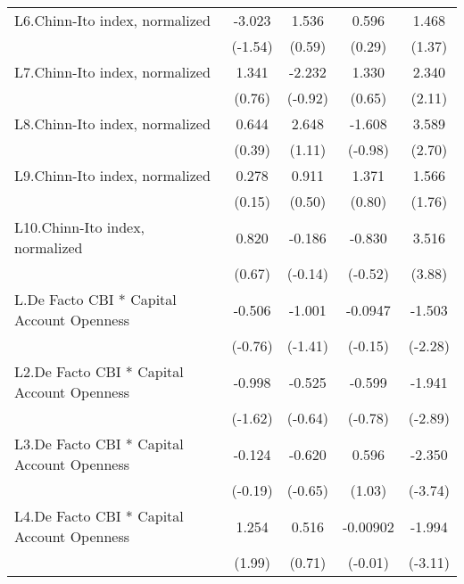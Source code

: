 {\begin{longtable}{l*{4}{c}}
\addlinespace
L6.Chinn-Ito index, normalized&   -3.023         &    1.536         &    0.596         &    1.468         \\
                &  (-1.54)         &   (0.59)         &   (0.29)         &   (1.37)         \\
\addlinespace
L7.Chinn-Ito index, normalized&    1.341         &   -2.232         &    1.330         &    2.340\sym{*}  \\
                &   (0.76)         &  (-0.92)         &   (0.65)         &   (2.11)         \\
\addlinespace
L8.Chinn-Ito index, normalized&    0.644         &    2.648         &   -1.608         &    3.589\sym{**} \\
                &   (0.39)         &   (1.11)         &  (-0.98)         &   (2.70)         \\
\addlinespace
L9.Chinn-Ito index, normalized&    0.278         &    0.911         &    1.371         &    1.566         \\
                &   (0.15)         &   (0.50)         &   (0.80)         &   (1.76)         \\
\addlinespace
L10.Chinn-Ito index, normalized&    0.820         &   -0.186         &   -0.830         &    3.516\sym{***}\\
                &   (0.67)         &  (-0.14)         &  (-0.52)         &   (3.88)         \\
\addlinespace
L.De Facto CBI * Capital Account Openness&   -0.506         &   -1.001         &  -0.0947         &   -1.503\sym{*}  \\
                &  (-0.76)         &  (-1.41)         &  (-0.15)         &  (-2.28)         \\
\addlinespace
L2.De Facto CBI * Capital Account Openness&   -0.998         &   -0.525         &   -0.599         &   -1.941\sym{**} \\
                &  (-1.62)         &  (-0.64)         &  (-0.78)         &  (-2.89)         \\
\addlinespace
L3.De Facto CBI * Capital Account Openness&   -0.124         &   -0.620         &    0.596         &   -2.350\sym{***}\\
                &  (-0.19)         &  (-0.65)         &   (1.03)         &  (-3.74)         \\
\addlinespace
L4.De Facto CBI * Capital Account Openness&    1.254\sym{*}  &    0.516         & -0.00902         &   -1.994\sym{**} \\
                &   (1.99)         &   (0.71)         &  (-0.01)         &  (-3.11)         \\

\end{longtable}}
